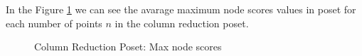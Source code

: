 \documentclass{article}
\begin{document}
\par In the Figure \ref{fig:scores_node_max_crp} we can see the avarage maximum node scores values in poset for each number of points $n$ in the column reduction poset.
\begin{figure}[ht]
  \vspace{-96pt}
  \centering
  \hspace*{-0.18999999999999995\textwidth}
  \caption{Column Reduction Poset: Max node scores}
  \label{fig:scores_node_max_crp}
\end{figure}
\end{document}

